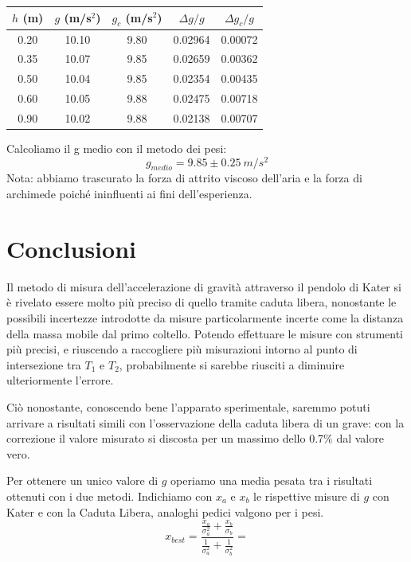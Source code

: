 \begin{center}
\begin{tabular}{c|c|c|c|c}
$h$ (m) & $g$ (m/s$^2$) & $g_c$ (m/s$^2$) & $\Delta g/g$ & $\Delta g_c/g$\\
\midrule
0.20 & 10.10 & 9.80 & 0.02964 & 0.00072 \\
0.35 & 10.07 & 9.85 & 0.02659 & 0.00362 \\
0.50 & 10.04 & 9.85 & 0.02354 & 0.00435 \\
0.60 & 10.05 & 9.88 & 0.02475 & 0.00718 \\
0.90 & 10.02 & 9.88 & 0.02138 & 0.00707 \\
\end{tabular}
\end{center}
Calcoliamo il g medio con il metodo dei pesi: 
$$ g_{medio} = 9.85 \pm 0.25 \ m/s^2  $$
Nota: abbiamo trascurato la forza di attrito viscoso dell'aria e la forza di archimede poiché ininfluenti ai fini dell'esperienza.

\section{Conclusioni}

Il metodo di misura dell'accelerazione di gravità attraverso il pendolo di Kater si è rivelato essere molto più preciso di quello tramite caduta libera, nonostante le possibili incertezze introdotte da misure particolarmente incerte come la distanza della massa mobile dal primo coltello. Potendo effettuare le misure con strumenti più precisi, e riuscendo a raccogliere più misurazioni intorno al punto di intersezione tra $T_1$ e $T_2$, probabilmente si sarebbe riusciti a diminuire ulteriormente l'errore. 

Ciò nonostante, conoscendo bene l'apparato sperimentale, saremmo potuti arrivare a risultati simili con l'osservazione della caduta libera di un grave: con la correzione il valore misurato si discosta per un massimo dello 0.7\% dal valore vero.


Per ottenere un unico valore di $g$ operiamo una media pesata tra i risultati ottenuti con i due metodi. Indichiamo con $x_a$ e $x_b$ le rispettive misure di $g$ con Kater e con la Caduta Libera, analoghi pedici valgono per i pesi.
\begin{equation}
x_{best}=\displaystyle{\frac{\frac{x_a}{\sigma_a^2}+\frac{x_b}{\sigma_b}}{\frac{1}{\sigma_a^2}+\frac{1}{\sigma_b^2}}}=
\end{equation}
